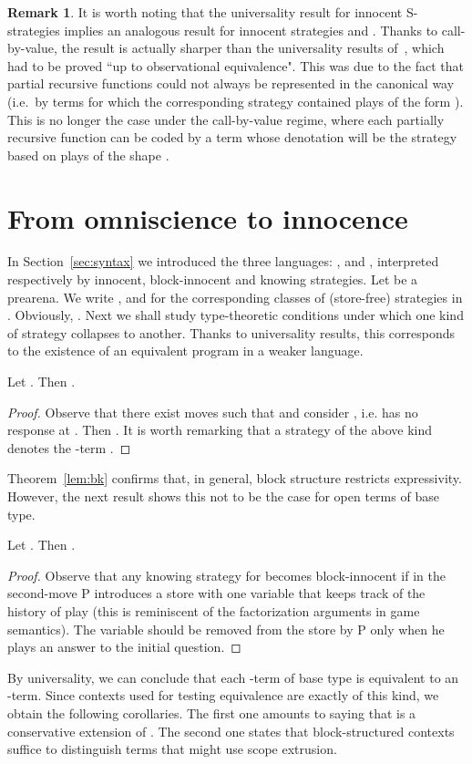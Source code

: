 \documentclass{CSML}
\theoremstyle{definition}\newtheorem{definition}[thm]{Definition}
\theoremstyle{definition}\newtheorem{example}[thm]{Example}
\theoremstyle{definition}\newtheorem{proposition}[thm]{Proposition}
\theoremstyle{definition}\newtheorem{lemma}[thm]{Lemma}
\theoremstyle{definition}\newtheorem{theorem}[thm]{Theorem}
\theoremstyle{definition}\newtheorem{corollary}[thm]{Corollary}
\theoremstyle{definition}\newtheorem{remark}[thm]{Remark}
\newcommand\nt[1]{#1}
\begin{document}
\begin{remark}
It is worth noting that the universality result for innocent S-strategies
implies an analogous result for innocent strategies and .
Thanks to call-by-value, the result is actually sharper than the universality results of~\cite{AJM00,HO00}, which had
to be proved ``up to observational equivalence". This was due to the fact that partial
recursive functions could not always be represented in the canonical way (i.e.\ by
terms for which the corresponding strategy contained plays of the form ).
This is no longer the case under the call-by-value
regime, where each partially recursive function  can be coded by a term
whose denotation will be the strategy based on plays of the shape .
\end{remark}



\section{From omniscience to innocence}

In Section~\ref{sec:syntax} we introduced the three languages: ,
 and , interpreted respectively by innocent, block-innocent and knowing 
 strategies. Let  be a \nt{prearena}. We write ,  and 
for the corresponding classes of (store-free) strategies  in .
Obviously, .
 Next we shall study type-theoretic conditions under which
 one kind of strategy collapses to another. Thanks to universality results,
 this corresponds to the existence of an equivalent program in a weaker language.
 \begin{thm}\label{lem:bk}
Let .
Then .
\end{thm}
\begin{proof}
Observe that there exist moves  such that
 and consider
, i.e. 
has no response at . Then .
It is worth remarking that a strategy of the above kind denotes the -term
.
\end{proof}
Theorem~\ref{lem:bk} confirms that, in general, block structure restricts expressivity.
However,  the next result shows this not to be the case for open terms of base type.
\begin{thm}
Let  .
Then .
\end{thm}
\begin{proof}
Observe that any knowing strategy for  becomes block-innocent if
in the second-move P introduces a store with one variable that keeps track of the history of
play (this is reminiscent of the factorization arguments in game semantics).
The variable should be removed from the store by P only when he plays an
answer to the initial question.
\end{proof}
By universality, we can conclude that each -term of base type
is equivalent to an -term. Since contexts used for
testing equivalence are exactly of this kind, we obtain the following corollaries.
The first one amounts to saying that  is a conservative extension of .
The second one states that block-structured contexts suffice to distinguish
terms that might use scope extrusion.
\end{document}
